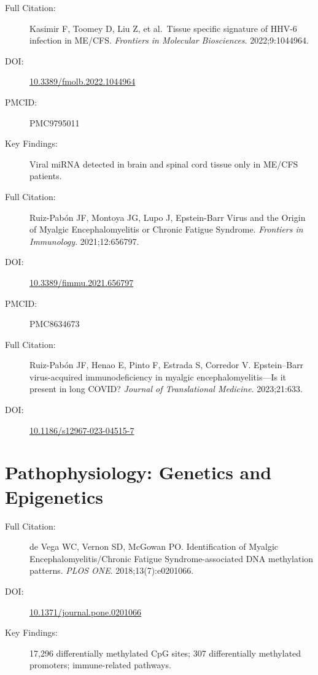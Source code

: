 \begin{description}
    \item[Full Citation:] Kasimir F, Toomey D, Liu Z, et al.\ Tissue specific signature of HHV-6 infection in ME/CFS. \textit{Frontiers in Molecular Biosciences}. 2022;9:1044964.
    \item[DOI:] \href{https://doi.org/10.3389/fmolb.2022.1044964}{10.3389/fmolb.2022.1044964}
    \item[PMCID:] PMC9795011
    \item[Key Findings:] Viral miRNA detected in brain and spinal cord tissue only in ME/CFS patients.
\end{description}

\begin{description}
    \item[Full Citation:] Ruiz-Pab\'on JF, Montoya JG, Lupo J, Epstein-Barr Virus and the Origin of Myalgic Encephalomyelitis or Chronic Fatigue Syndrome. \textit{Frontiers in Immunology}. 2021;12:656797.
    \item[DOI:] \href{https://doi.org/10.3389/fimmu.2021.656797}{10.3389/fimmu.2021.656797}
    \item[PMCID:] PMC8634673
\end{description}

\begin{description}
    \item[Full Citation:] Ruiz-Pab\'on JF, Henao E, Pinto F, Estrada S, Corredor V. Epstein--Barr virus-acquired immunodeficiency in myalgic encephalomyelitis---Is it present in long COVID? \textit{Journal of Translational Medicine}. 2023;21:633.
    \item[DOI:] \href{https://doi.org/10.1186/s12967-023-04515-7}{10.1186/s12967-023-04515-7}
\end{description}

\section{Pathophysiology: Genetics and Epigenetics}
\label{sec:bib-genetics}

\begin{description}
    \item[Full Citation:] de Vega WC, Vernon SD, McGowan PO. Identification of Myalgic Encephalomyelitis/Chronic Fatigue Syndrome-associated DNA methylation patterns. \textit{PLOS ONE}. 2018;13(7):e0201066.
    \item[DOI:] \href{https://doi.org/10.1371/journal.pone.0201066}{10.1371/journal.pone.0201066}
    \item[Key Findings:] 17,296 differentially methylated CpG sites; 307 differentially methylated promoters; immune-related pathways.
\end{description}

